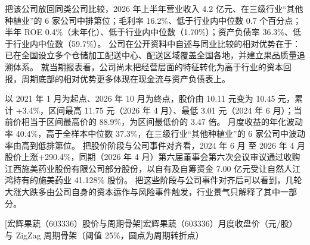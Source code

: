  把该公司放回同类公司比较，2026 年上半年营业收入 4.2 亿元、在三级行业“其他种植业”的 6 家公司中排第位；毛利率 16.2\%、低于行业内中位数 0.7 个百分点；半年 ROE 0.4\%（未年化）、低于行业内中位数（1.70\%）；资产负债率 36.3\%、低于行业内中位数（59.7\%）。 公司在公开资料中自述与同业比较的相对优势在于：已在全国设立多个仓储加工配送中心、配送区域覆盖全国各地，并建立果品质量追溯体系。 就当期报表看，公司尚未把经营层面的特征转化为高于行业的资本回报，周期底部的相对优势更多体现在现金流与资产负债表上。

 以 2021 年 1 月为起点、2026 年 10 月为终点，股价由 10.11 元变为 10.45 元，累计 +3.4\%，区间最高 11.75 元（2026 年 4 月）、最低 3.01 元（2024 年 6 月）；当前价相当于区间最高价的 88.9\%，为区间最低价的 3.47 倍。 月度收益的年化波动率 40.4\%，高于全样本中位数 37.3\%，在三级行业“其他种植业”的 6 家公司中波动率由高到低排第位。 把股价阶段与公司事件对齐看，2024 年 6 月 至 2026 年 4 月股价上涨+290.4\%，同期（2026 年 4 月）第六届董事会第六次会议审议通过收购江西施美药业股份有限公司部分股份，以自有及自筹资金 7.00 亿元受让自然人江鸿持有的施美药业 41.128\% 股份。 把这些阶段与公司事件对齐后可以看到，几轮大涨大跌多由公司自身的资本运作与风险事件触发，行业景气只解释了其中一部分。

\begin{center}
\begin{minipage}{\textwidth}\centering
{}

[宏辉果蔬（603336）股价与周期骨架]{宏辉果蔬（603336）月度收盘价（元/股）与 ZigZag 周期骨架（阈值 25\%，圆点为周期转折点）}
\end{minipage}
\end{center}

